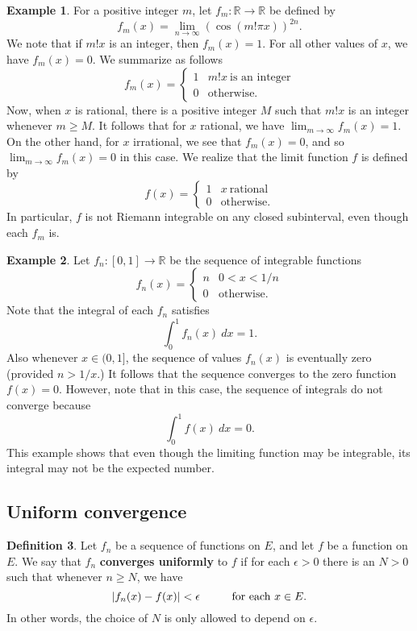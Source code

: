 \documentclass[12pt]{article}
\theoremstyle{definition}
\newtheorem{definition}{Definition}
\newtheorem{example}[definition]{Example}
\theoremstyle{theorem}
\begin{document}
\begin{example}
For a positive integer $m$, let $f_m : \mathbb{R} \to \mathbb{R}$ be defined by 
\[
f_m(x) = \lim_{n \to \infty}(\cos(m! \pi x))^{2n}.
\]
We note that if $m!x$ is an integer, then $f_m(x) = 1$. For all other values of $x$, we have $f_m(x) = 0$. We summarize as follows 
\[
f_m(x) = \begin{cases}
1 & m! x \: \text{is an integer} \\
0 & \text{otherwise}.
\end{cases}
\]
Now, when $x$ is rational, there is a positive integer $M$ such that $m!x$ is an integer whenever $m \geqslant M$. It follows that for $x$ rational, we have $\lim_{m \to \infty}f_m(x) = 1$. On the other hand, for $x$ irrational, we see that $f_m(x) = 0$, and so $\lim_{m \to \infty}f_m(x) = 0$ in this case. We realize that the limit function $f$ is defined by 
\[
f(x) = \begin{cases}
1 & x \: \text{rational} \\
0 & \text{otherwise}.
\end{cases}
\]
In particular, $f$ is not Riemann integrable on any closed subinterval, even though each $f_m$ is. 
\end{example}

\begin{example}
Let $f_n : [0,1] \to \mathbb{R}$ be the sequence of integrable functions 
\[
f_n(x) = \begin{cases}
n & 0 < x < 1/n \\
0 & \text{otherwise}.
\end{cases}
\]
Note that the integral of each $f_n$ satisfies 
\[
\int_0^1 f_n(x) \: dx = 1.
\]
Also whenever $x \in (0,1]$, the sequence of values $f_n(x)$ is eventually zero (provided $n > 1/x$.) It follows that the sequence converges to the zero function $f(x) = 0$. However, note that in this case, the sequence of integrals do not converge because 
\[
\int_0^1 f(x) \: dx = 0.
\]
This example shows that even though the limiting function may be integrable, its integral may not be the expected number. 
\end{example}

\subsection{Uniform convergence}

\begin{definition}
Let $f_n$ be a sequence of functions on $E$, and let $f$ be a function on $E$. We say that $f_n$ \textbf{converges uniformly} to $f$ if for each $\epsilon >0$ there is an $N > 0$ such that whenever $n \geqslant N$, we have 
\[
|f_n(x) - f(x)| < \epsilon \hspace{10mm} \text{for each $x \in E$.}
\]
In other words, the choice of $N$ is only allowed to depend on $\epsilon$. 
\end{definition}
\end{document}
